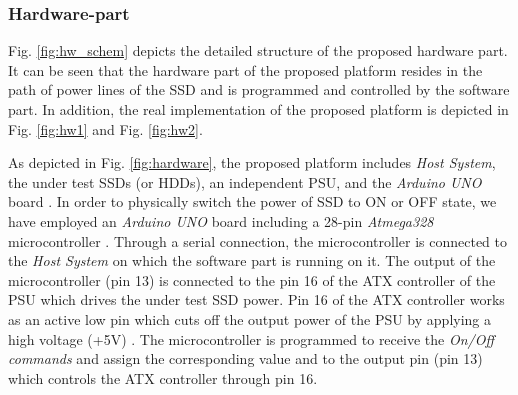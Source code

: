 \subsubsection{Hardware-part}
\vspace{-0.7em}
\label{sec:hw}
Fig. \ref{fig:hw_schem} depicts the detailed structure of the proposed hardware part. It can be seen that the hardware part of the proposed platform resides in the path of power lines of the SSD and is programmed and controlled by the software part. In addition, the real implementation of the proposed platform is depicted in Fig. \ref{fig:hw1} and Fig. \ref{fig:hw2}.
\begin{figure*}[!t]
	\centering
	\hfil
	\hspace{-.8pt}
	\hfil
	\hspace{-.8pt}
	
	\vspace{-0.5em}
	\caption{Hardware part of the proposed test platform.}
	\vspace{-2em}
	\label{fig:hardware}
\end{figure*}

As depicted in Fig. \ref{fig:hardware}, the proposed platform includes \emph{Host System}, the under test SSDs (or HDDs), an independent PSU, and the \emph{Arduino UNO} board \cite{arduinouno}.
In order to physically switch the power of SSD to ON or OFF state, we have employed an \emph{Arduino UNO} board including a 28-pin \emph{Atmega328} microcontroller \cite{atmega16}.
Through a serial connection, the microcontroller is connected to the \emph{Host System} on which the software part is running on it. The output of the microcontroller (pin 13) is connected to the pin  16 of the ATX controller of the PSU which drives the under test SSD power. Pin 16 of the ATX controller works as an active low pin which cuts off the output power of the PSU by applying a high voltage (+5V) \cite{PSU}.  
The microcontroller is programmed to receive the \emph{On/Off commands} and assign the corresponding value  and  to the output pin (pin 13) which controls the ATX‌ controller through pin 16.

